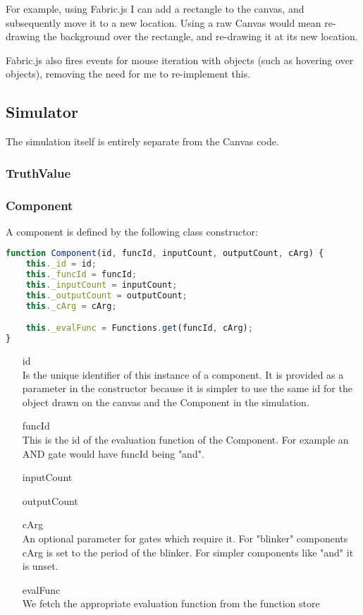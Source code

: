 For example, using Fabric.js I can add a rectangle to the canvas, and subsequently move it to a new location. Using a raw Canvas would mean re-drawing the background over the rectangle, and re-drawing it at its new location.

Fabric.js also fires events for mouse iteration with objects (such as hovering over objects), removing the need for me to re-implement this.

\subsection{Simulator}
The simulation itself is entirely separate from the Canvas code.

\subsubsection{TruthValue}


\subsubsection{Component}
A component is defined by the following class constructor:

\begin{lstlisting}[language=JavaScript]
function Component(id, funcId, inputCount, outputCount, cArg) {
    this._id = id;
    this._funcId = funcId;
    this._inputCount = inputCount;
    this._outputCount = outputCount;
    this._cArg = cArg;

    this._evalFunc = Functions.get(funcId, cArg);
}
\end{lstlisting}

\begin{itemize}
	\item[id] \hfill \\ 
	Is the unique identifier of this instance of a component. It is provided as a parameter in the constructor because it is simpler to use the same id for the object drawn on the canvas and the Component in the simulation.
	\item[funcId] \hfill \\ 
	This is the id of the evaluation function of the Component. For example an AND gate would have funcId being "and".
	\item[inputCount]
	\item[outputCount]
	\item[cArg] \hfill \\ 
	An optional parameter for gates which require it. For "blinker" components cArg is set to the period of the blinker. For simpler components like "and" it is unset.
	\item[evalFunc] \hfill \\ 
	We fetch the appropriate evaluation function from the function store
\end{itemize}

